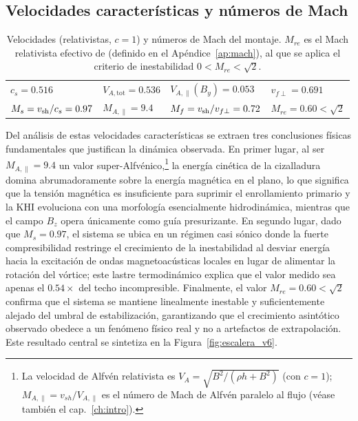 \subsection{Velocidades características y números de Mach}

\begin{table}[H]\centering
\caption{Velocidades (relativistas, $c=1$) y números de Mach del montaje. $M_{re}$ es el Mach relativista efectivo de \textcite{konigl1980} (definido en el Apéndice~\ref{ap:mach}), al que se aplica el criterio de inestabilidad $0<M_{re}<\sqrt2$.}
\label{tab:mach_v6}
{\small\setlength{\tabcolsep}{4pt}
\begin{tabular}{llll}
\hline
$c_s=0.516$ & $V_{A,\mathrm{tot}}=0.536$ & $V_{A,\parallel}(B_y)=0.053$ & $v_{f\perp}=0.691$\\
$M_s=v_{\mathrm{sh}}/c_s=0.97$ & $M_{A,\parallel}=9.4$ & $M_f=v_{\mathrm{sh}}/v_{f\perp}=0.72$ & $M_{re}=0.60<\sqrt{2}$\\
\hline
\end{tabular}}
\end{table}
\noindent Del análisis de estas velocidades características se extraen tres conclusiones físicas fundamentales que justifican la dinámica observada. En primer lugar, al ser $M_{A,\parallel}=9.4$ un valor super-Alfvénico,\footnote{La velocidad de Alfvén relativista es $V_A=\sqrt{B^2/(\rho h+B^2)}$ (con $c=1$); $M_{A,\parallel}=v_{sh}/V_{A,\parallel}$ es el número de Mach de Alfvén paralelo al flujo (véase también el cap.~\ref{ch:intro}).} la energía cinética de la cizalladura domina abrumadoramente sobre la energía magnética en el plano, lo que significa que la tensión magnética es insuficiente para suprimir el enrollamiento primario y la KHI evoluciona con una morfología esencialmente hidrodinámica, mientras que el campo $B_z$ opera únicamente como guía presurizante. En segundo lugar, dado que $M_s=0.97$, el sistema se ubica en un régimen casi sónico donde la fuerte compresibilidad restringe el crecimiento de la inestabilidad al desviar energía hacia la excitación de ondas magnetoacústicas locales en lugar de alimentar la rotación del vórtice; este lastre termodinámico explica que el valor medido sea apenas el $0.54\times$ del techo incompresible. Finalmente, el valor $M_{re}=0.60 < \sqrt{2}$ confirma que el sistema se mantiene linealmente inestable y suficientemente alejado del umbral de estabilización, garantizando que el crecimiento asintótico observado obedece a un fenómeno físico real y no a artefactos de extrapolación. Este resultado central se sintetiza en la Figura~\ref{fig:escalera_v6}.

